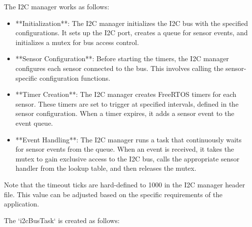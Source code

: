\documentclass{book}
\begin{document}
\par The I2C manager works as follows:
\begin{itemize}
    \item **Initialization**: The I2C manager initializes the I2C bus with the specified configurations. It sets up the I2C port, creates a queue for sensor events, and initializes a mutex for bus access control.
    \item **Sensor Configuration**: Before starting the timers, the I2C manager configures each sensor connected to the bus. This involves calling the sensor-specific configuration functions.
    \item **Timer Creation**: The I2C manager creates FreeRTOS timers for each sensor. These timers are set to trigger at specified intervals, defined in the sensor configuration. When a timer expires, it adds a sensor event to the event queue.
    \item **Event Handling**: The I2C manager runs a task that continuously waits for sensor events from the queue. When an event is received, it takes the mutex to gain exclusive access to the I2C bus, calls the appropriate sensor handler from the lookup table, and then releases the mutex.
\end{itemize}

\par Note that the timeout ticks are hard-defined to 1000 in the I2C manager header file. This value can be adjusted based on the specific requirements of the application.

\par The `i2cBusTask` is created as follows:
\end{document}
